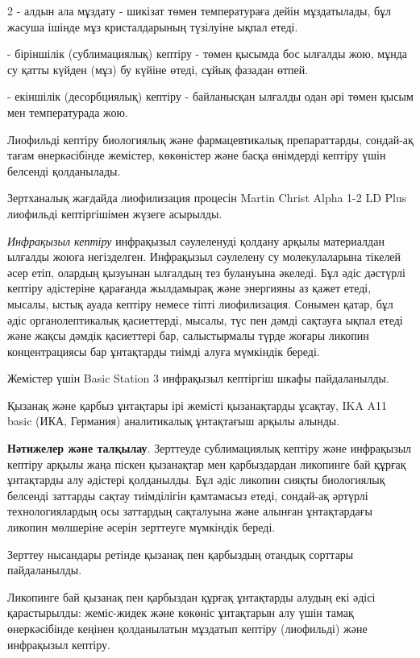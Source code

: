 \begin{multicols}{2}
- алдын ала мұздату - шикізат төмен температураға дейін мұздатылады, бұл
жасуша ішінде мұз кристалдарының түзілуіне ықпал етеді.

- біріншілік (сублимациялық) кептіру - төмен қысымда бос ылғалды жою,
мұнда су қатты күйден (мұз) бу күйіне өтеді, сұйық фазадан өтпей.

- екіншілік (десорбциялық) кептіру - байланысқан ылғалды одан әрі төмен
қысым мен температурада жою.

Лиофильді кептіру биологиялық және фармацевтикалық препараттарды,
сондай-ақ тағам өнеркәсібінде жемістер, көкөністер және басқа өнімдерді
кептіру үшін белсенді қолданылады.

Зертханалық жағдайда лиофилизация процесін Martin Christ Alpha 1-2 LD
Plus лиофильді кептіргішімен жүзеге асырылды.

\emph{Инфрақызыл кептіру} инфрақызыл сәулеленуді қолдану арқылы
материалдан ылғалды жоюға негізделген. Инфрақызыл сәулелену су
молекулаларына тікелей әсер етіп, олардың қызуынан ылғалдың тез
булануына әкеледі. Бұл әдіс дәстүрлі кептіру әдістеріне қарағанда
жылдамырақ және энергияны аз қажет етеді, мысалы, ыстық ауада кептіру
немесе тіпті лиофилизация. Сонымен қатар, бұл әдіс органолептикалық
қасиеттерді, мысалы, түс пен дәмді сақтауға ықпал етеді және жақсы
дәмдік қасиеттері бар, салыстырмалы түрде жоғары ликопин концентрациясы
бар ұнтақтарды тиімді алуға мүмкіндік береді.

Жемістер үшін Basic Station 3 инфрақызыл кептіргіш шкафы пайдаланылды.

Қызанақ және қарбыз ұнтақтары ірі жемісті қызанақтарды ұсақтау, IKA A11
basic (ИКА, Германия) аналитикалық ұнтақтағыш арқылы алынды.

{\bfseries Нәтижелер және талқылау}. Зерттеуде сублимациялық кептіру және
инфрақызыл кептіру арқылы жаңа піскен қызанақтар мен қарбыздардан
ликопинге бай құрғақ ұнтақтарды алу әдістері қолданылды. Бұл әдіс
ликопин сияқты биологиялық белсенді заттарды сақтау тиімділігін
қамтамасыз етеді, сондай-ақ әртүрлі технологиялардың осы заттардың
сақталуына және алынған ұнтақтардағы ликопин мөлшеріне әсерін зерттеуге
мүмкіндік береді.

Зерттеу нысандары ретінде қызанақ пен қарбыздың отандық сорттары
пайдаланылды.

Ликопинге бай қызанақ пен қарбыздан құрғақ ұнтақтарды алудың екі әдісі
қарастырылды: жеміс-жидек және көкөніс ұнтақтарын алу үшін тамақ
өнеркәсібінде кеңінен қолданылатын мұздатып кептіру (лиофильді) және
инфрақызыл кептіру.


\end{multicols}
